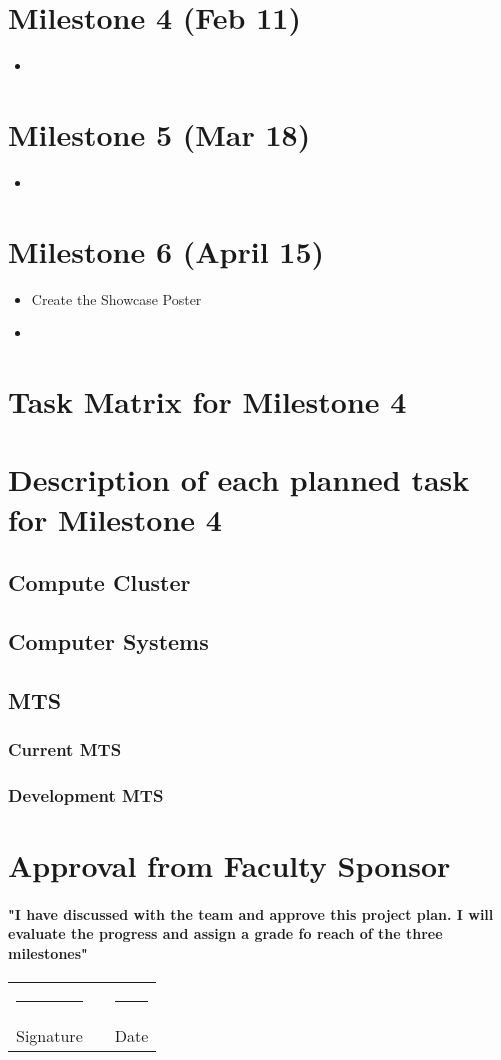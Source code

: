 \documentclass[12pt]{article}
\newcommand\tab[1][1cm]{\hspace*{#1}}
\newcommand{\doubleSignature}[2]{
	\begin{center}
		
	\end{center}
	\vspace{2cm}
	
	\noindent
	\begin{tabular}{lcl}
		\rule{7cm}{1pt} & \hspace{2cm} & \rule{3cm}{1pt} \\
		#1 & & #2
	\end{tabular}
	\vspace{1cm}
}
\begin{document}
\section{Milestone 4 (Feb 11)}
\begin{itemize}
	\item 
\end{itemize}

\section{Milestone 5 (Mar 18)}
\begin{itemize}
	\item 
\end{itemize}

\section{Milestone 6 (April 15)}
\begin{itemize}
	\item Create the Showcase Poster
	\item 
\end{itemize}

\section{Task Matrix for Milestone 4}
\begin{tabular}

\end{tabular}

\section{Description of each planned task for Milestone 4}
\subsection{Compute Cluster}
\subsection{Computer Systems}
\subsection{MTS}
\subsubsection{Current MTS}
\subsubsection{Development MTS}

\section{Approval from Faculty Sponsor}
\paragraph{\tab "I have discussed with the team and approve this project plan. I will evaluate the progress and assign a grade fo reach of the three milestones"}
\doubleSignature{Signature}{Date}
\end{document}
